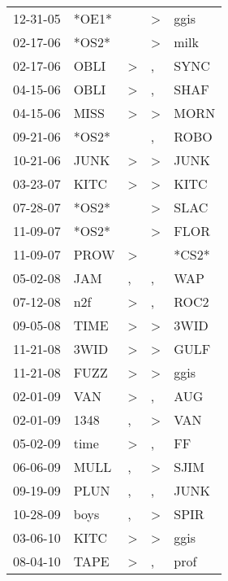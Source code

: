 \begin{supertabular}{lllll}
 12-31-05 &  *OE1* &                  &  \textgreater &   ggis \\
 02-17-06 &  *OS2* &                  &  \textgreater &   milk \\
 02-17-06 &   OBLI &     \textgreater &             , &   SYNC \\
 04-15-06 &   OBLI &     \textgreater &             , &   SHAF \\
 04-15-06 &   MISS &     \textgreater &  \textgreater &   MORN \\
 09-21-06 &  *OS2* &                  &             , &   ROBO \\
 10-21-06 &   JUNK &     \textgreater &  \textgreater &   JUNK \\
 03-23-07 &   KITC &     \textgreater &  \textgreater &   KITC \\
 07-28-07 &  *OS2* &                  &  \textgreater &   SLAC \\
 11-09-07 &  *OS2* &                  &  \textgreater &   FLOR \\
 11-09-07 &   PROW &     \textgreater &               &  *CS2* \\
 05-02-08 &    JAM &                , &             , &    WAP \\
 07-12-08 &    n2f &     \textgreater &             , &   ROC2 \\
 09-05-08 &   TIME &     \textgreater &  \textgreater &   3WID \\
 11-21-08 &   3WID &     \textgreater &  \textgreater &   GULF \\
 11-21-08 &   FUZZ &     \textgreater &  \textgreater &   ggis \\
 02-01-09 &    VAN &     \textgreater &             , &    AUG \\
 02-01-09 &   1348 &                , &  \textgreater &    VAN \\
 05-02-09 &   time &     \textgreater &             , &     FF \\
 06-06-09 &   MULL &                , &  \textgreater &   SJIM \\
 09-19-09 &   PLUN &                , &             , &   JUNK \\
 10-28-09 &   boys &                , &  \textgreater &   SPIR \\
 03-06-10 &   KITC &     \textgreater &  \textgreater &   ggis \\
 08-04-10 &   TAPE &     \textgreater &             , &   prof \\

\end{supertabular}
